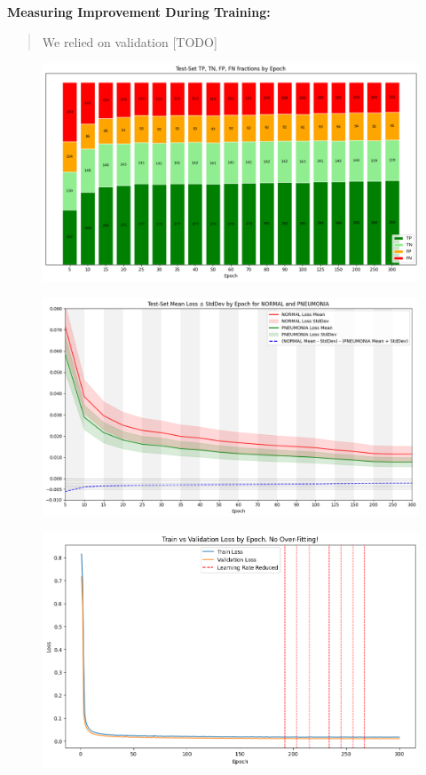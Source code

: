 \documentclass{article}
\begin{document}
\textbf{Measuring Improvement During Training:}
\begin{quote}
We relied on validation [TODO]
\end{quote}

\begin{figure}[H]
  \centering
  \includegraphics[width=1\linewidth]{confusion_by_epoch.png}
\end{figure}

\begin{figure}[H]
  \centering
  \includegraphics[width=1\linewidth]{losses_mean_std_by_epoch.png}
\end{figure}

\begin{figure}[H]
  \centering
  \includegraphics[width=1\linewidth]{train_val_loss_by_epoch.png}
\end{figure}
\end{document}
